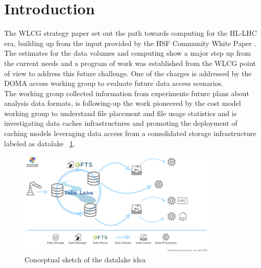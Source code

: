 \section{Introduction}
The WLCG strategy paper \cite{wlcg} set out the path towards computing for the HL-LHC era, building up from the input provided by the HSF \cite{hsf} Community White Paper \cite{cwp}.
The estimates for the data volumes and computing show a major step up from the current needs and a program of work was established from the WLCG point of view to address this future challenge. One of the charges is addressed by the DOMA access working group to evaluate future data access scenarios.\\
The working group collected information from experiments future plans about analysis data formats, is following-up the work pioneered by the cost model working group to understand file placement and file usage statistics and is investigating data caches infrastructures and promoting the deployment of caching models leveraging data access from a consolidated storage infrastructure labeled as datalake ~\ref{datalake-sketch-horizontal}.

\begin{figure}
  \centering
  \includegraphics[height=5cm]{Datalake-sketch-horizontal.png}
  \caption{{\em} Conceptual sketch of the datalake idea}
  \label{datalake-sketch-horizontal}
\end{figure}



